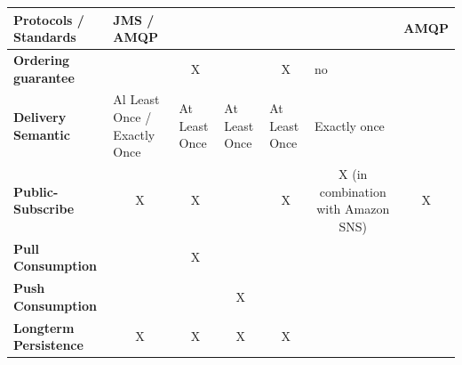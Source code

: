 \begin{landscape}
\begin{table}[h]
\begin{tabular}{|p{3cm}|p{3cm}|p{3cm}|p{3cm}|l|l|l|}
        \multicolumn{1}{|l|}{\textbf{Protocols / Standards}}     & \multicolumn{1}{l|}{JMS / AMQP}                   & \multicolumn{1}{l|}{}                              & \multicolumn{1}{l|}{}                   & \multicolumn{1}{l|}{}                     & \multicolumn{1}{l|}{}                                   & \multicolumn{1}{l|}{AMQP}                       \\ \hline
        \multicolumn{1}{|l|}{\textbf{Ordering guarantee}}        & \multicolumn{1}{l|}{}                             & \multicolumn{1}{c|}{X}                             & \multicolumn{1}{l|}{}                   & \multicolumn{1}{c|}{X}                    & \multicolumn{1}{l|}{no}                                 & \multicolumn{1}{l|}{}                           \\ \hline
        \multicolumn{1}{|l|}{\textbf{Delivery Semantic}}         & \multicolumn{1}{l|}{Al Least Once / Exactly Once} & \multicolumn{1}{l|}{At Least Once}                 & \multicolumn{1}{l|}{At Least Once}      & \multicolumn{1}{l|}{At Least Once}        & \multicolumn{1}{l|}{Exactly once}                       & \multicolumn{1}{l|}{}                           \\ \hline
        \multicolumn{1}{|l|}{\textbf{Public-Subscribe}}          & \multicolumn{1}{c|}{X}                            & \multicolumn{1}{c|}{X}                             & \multicolumn{1}{c|}{}                   & \multicolumn{1}{c|}{X}                    & \multicolumn{1}{c|}{X (in combination with Amazon SNS)} & \multicolumn{1}{c|}{X}                          \\ \hline
        \multicolumn{1}{|l|}{\textbf{Pull Consumption}}          & \multicolumn{1}{l|}{}                             & \multicolumn{1}{c|}{X}                             & \multicolumn{1}{l|}{}                   & \multicolumn{1}{l|}{}                     & \multicolumn{1}{l|}{}                                   & \multicolumn{1}{l|}{}                           \\ \hline
        \multicolumn{1}{|l|}{\textbf{Push Consumption}}          & \multicolumn{1}{l|}{}                             & \multicolumn{1}{c|}{}                              & \multicolumn{1}{c|}{X}                  & \multicolumn{1}{l|}{}                     & \multicolumn{1}{l|}{}                                   & \multicolumn{1}{l|}{}                           \\ \hline
        \multicolumn{1}{|l|}{\textbf{Longterm Persistence}}      & \multicolumn{1}{c|}{X}                            & \multicolumn{1}{c|}{X}                             & \multicolumn{1}{c|}{X}                  & \multicolumn{1}{c|}{X}                    & \multicolumn{1}{l|}{}                                   & \multicolumn{1}{l|}{}                           \\ \hline

\end{tabular}
\end{table}
\end{landscape}

